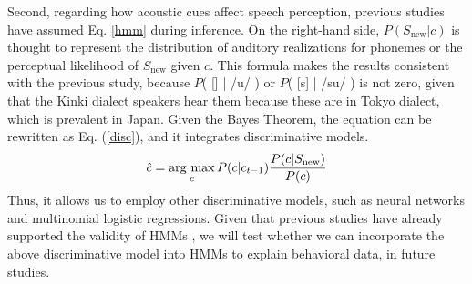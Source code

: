 \documentclass[a4paper,11pt,twocolumn]{article}
\newcommand{\argmax}{\mathop{\rm arg~max}\limits}
\begin{document}
Second, regarding how acoustic cues affect speech perception, previous studies \cite{wilson2013bayesian, kishiyama2021influence} have assumed Eq. \ref{hmm} during inference. On the right-hand side, $P(S_{\text{new}}|c)$ is thought to represent the distribution of auditory realizations for phonemes or the perceptual likelihood of $S_{\text{new}}$ given $c$. This formula makes the results consistent with the previous study, because $P$( [\textsubring{\textturnm}] | /u/ ) or $P$( [s] | /su/ ) is not zero, given that the Kinki dialect speakers hear them because these are in Tokyo dialect, which is prevalent in Japan. Given the Bayes Theorem, the equation can be rewritten as Eq. (\ref{disc}), and it integrates discriminative models.
%
\begin{equation} \label{disc}
    \hat{c} = \argmax_{c} P(c | c_{t-1}) \frac{P(c|S_{\text{new}})}{P(c)}
\end{equation}
%
Thus, it allows us to employ other discriminative models, such as neural networks and multinomial logistic regressions. Given that previous studies have already supported the validity of HMMs \cite{kishiyama2021influence}, we will test whether we can incorporate the above discriminative model into HMMs to explain behavioral data, in future studies.




\end{document}
